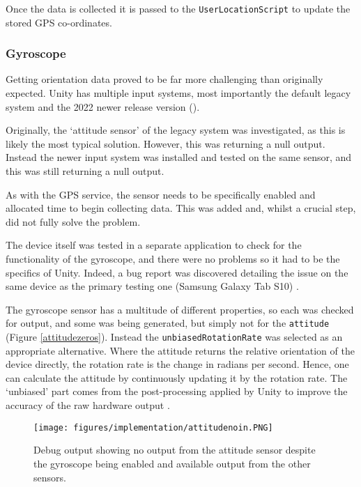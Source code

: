 \documentclass{article}
\begin{document}
Once the data is collected it is passed to the \verb|UserLocationScript| to update the stored GPS co-ordinates.

\subsubsection{Gyroscope}
Getting orientation data proved to be far more challenging than originally expected. Unity has multiple input systems, most importantly the default legacy system and the 2022 newer release version (\cite{movement:newinputsystem}). 

Originally, the `attitude sensor' of the legacy system was investigated, as this is likely the most typical solution. However, this was returning a null output. Instead the newer input system was installed and tested on the same sensor, and this was still returning a null output. 

As with the GPS service, the sensor needs to be specifically enabled and allocated time to begin collecting data. This was added and, whilst a crucial step, did not fully solve the problem.

The device itself was tested in a separate application to check for the functionality of the gyroscope, and there were no problems so it had to be the specifics of Unity. Indeed, a bug report was discovered detailing the issue on the same device as the primary testing one (Samsung Galaxy Tab S10) \cite{movement:gyroissue}. 

The gyroscope sensor has a multitude of different properties, so each was checked for output, and some was being generated, but simply not for the \verb|attitude| (Figure \ref{attitudezeros}). Instead the \verb|unbiasedRotationRate| was selected as an appropriate alternative. Where the attitude returns the relative orientation of the device directly, the rotation rate is the change in radians per second. Hence, one can calculate the attitude by continuously updating it by the rotation rate. The `unbiased' part comes from the post-processing applied by Unity to improve the accuracy of the raw hardware output \cite{movement:rotationrate}. 

\begin{figure}[]
    \centering
    \texttt{[image: figures/implementation/attitudenoin.PNG]}
        \caption{Debug output showing no output from the attitude sensor despite the gyroscope being enabled and available output from the other sensors.}
        \label{fig:attitudezeros}
\end{figure}
\end{document}
